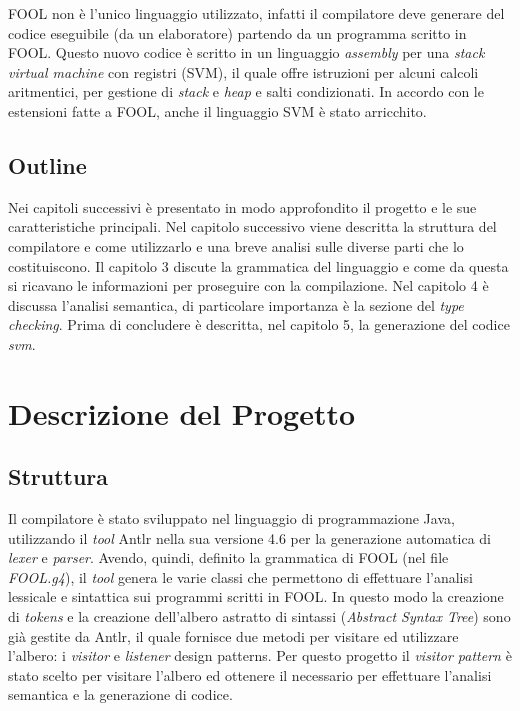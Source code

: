 \documentclass{scrreprt}
\begin{document}
FOOL non è l'unico linguaggio utilizzato, infatti il compilatore deve generare del codice eseguibile (da un elaboratore) partendo da un programma scritto in FOOL. Questo nuovo codice è scritto in un linguaggio \textit{assembly} per una \textit{stack virtual machine} con registri (SVM), il quale offre istruzioni per alcuni calcoli aritmentici, per gestione di \textit{stack} e \textit{heap} e salti condizionati. In accordo con le estensioni fatte a FOOL, anche il linguaggio SVM è stato arricchito.

\section{Outline}
Nei capitoli successivi è presentato in modo approfondito il progetto e le sue caratteristiche principali. Nel capitolo successivo viene descritta la struttura del compilatore e come utilizzarlo e una breve analisi sulle diverse parti che lo costituiscono. Il capitolo 3 discute la grammatica del linguaggio e come da questa si ricavano le informazioni per proseguire con la compilazione. Nel capitolo 4 è discussa l'analisi semantica, di particolare importanza è la sezione del \textit{type checking}. Prima di concludere è descritta, nel capitolo 5, la generazione del codice \textit{svm}.

\chapter{Descrizione del Progetto}
\section{Struttura}
Il compilatore è stato sviluppato nel linguaggio di programmazione Java, utilizzando il \textit{tool} Antlr nella sua versione 4.6 per la generazione automatica di \textit{lexer} e \textit{parser}.
Avendo, quindi, definito la grammatica di FOOL (nel file \textit{FOOL.g4}), il \textit{tool} genera le varie classi che permettono di effettuare l'analisi lessicale e sintattica sui programmi scritti in FOOL.
In questo modo la creazione di \textit{tokens} e la creazione dell'albero astratto di sintassi (\textit{Abstract Syntax Tree}) sono già gestite da Antlr, il quale fornisce due metodi per visitare ed utilizzare l'albero: i \textit{visitor} e \textit{listener} design patterns.
Per questo progetto il \textit{visitor pattern} è stato scelto per visitare l'albero ed ottenere il necessario per effettuare l'analisi semantica e la generazione di codice.
\end{document}

